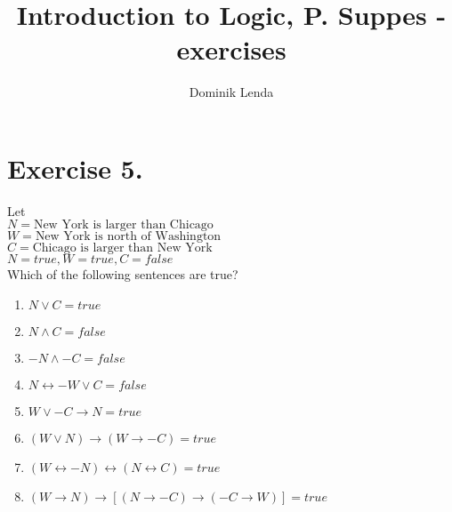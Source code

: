 \documentclass{article}
\title{Introduction to Logic, P. Suppes - exercises}
\author{Dominik Lenda}
\begin{document}
\maketitle
\section*{Exercise 5.}
Let\\
$N = \text{New York is larger than Chicago}$\\
$W = \text{New York is north of Washington}$\\
$C = \text{Chicago is larger than New York}$\\
$N = true, W = true, C = false$\\
Which of the following sentences are true?
\medskip
\begin{enumerate}[label=(\alph*)]
\item $N \vee C = true$
\item $N \wedge C = false$
\item $-N \wedge -C = false$
\item $N \leftrightarrow -W \vee C = false$
\item $W \vee -C \rightarrow N = true$
\item $(W \vee N) \rightarrow (W \rightarrow -C) = true$
\item $(W \leftrightarrow -N) \leftrightarrow (N \leftrightarrow C) = true$
\item $(W \rightarrow N) \rightarrow [(N \rightarrow -C) \rightarrow (-C \rightarrow W)] = true$
\end{enumerate}
\end{document}
